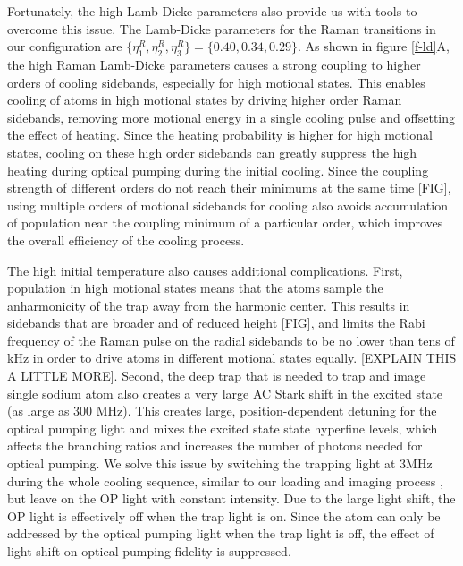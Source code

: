 \documentclass[aps,prl,twocolumn,groupedaddress]{revtex4-1}
\begin{document}
Fortunately, the high Lamb-Dicke parameters also
provide us with tools to overcome this issue. The Lamb-Dicke parameters for the
Raman transitions in our configuration are $\{\eta^R_{1},\eta^R_{2},\eta^R_{3}\} = \{0.40, 0.34, 0.29\}$. As shown in
figure \ref{f-ld}A, the high Raman Lamb-Dicke parameters causes a strong coupling to higher orders
of cooling sidebands, especially for high motional states.
This enables cooling of atoms in high motional states by driving higher order Raman sidebands,
removing more motional energy in a single cooling pulse and offsetting the effect of heating. Since the heating probability is higher for high motional states,
cooling on these high order sidebands can greatly suppress the high heating during
optical pumping during the initial cooling. Since the coupling strength of different orders
do not reach their minimums at the same time [FIG], using multiple orders of motional sidebands
for cooling also avoids accumulation of population near the coupling minimum of a particular
order, which improves the overall efficiency of the cooling process.

The high initial temperature also causes additional complications.  First, population in high motional states means that the atoms sample
the anharmonicity of the trap away from the harmonic center.  This results in sidebands that are broader and of reduced height [FIG], and limits the Rabi frequency of the Raman pulse
on the radial sidebands to be no lower than tens of kHz in order to drive atoms in
different motional states equally.  [EXPLAIN THIS A LITTLE MORE].
Second, the deep trap that is needed to trap and image single sodium atom also creates
a very large AC Stark shift in the excited state (as large as 300 MHz).
This creates large, position-dependent detuning for the optical pumping light and mixes the excited state state hyperfine levels,
which affects the branching ratios and increases the number of photons needed for optical pumping.
We solve this issue by switching the trapping light at $3\text{MHz}$
during the whole cooling sequence, similar to our loading and imaging process \cite{Hutzler2017-LightShifts}, but leave on the OP light with constant intensity.
Due to the large light shift, the OP light is effectively off when the trap light is on.
Since the atom can only be addressed by the optical pumping light when the trap light is off,
the effect of light shift on optical pumping fidelity is suppressed.
\end{document}
